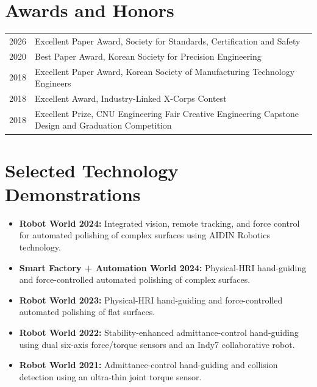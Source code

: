 \documentclass[10pt,letterpaper]{article}
\begin{document}
\section{Awards and Honors}
\begin{tabularx}{\textwidth}{@{}r X@{}}
2026 & Excellent Paper Award, Society for Standards, Certification and Safety\\
2020 & Best Paper Award, Korean Society for Precision Engineering\\
2018 & Excellent Paper Award, Korean Society of Manufacturing Technology Engineers\\
2018 & Excellent Award, Industry-Linked X-Corps Contest\\
2018 & Excellent Prize, CNU Engineering Fair Creative Engineering Capstone Design and Graduation Competition
\end{tabularx}

\section{Selected Technology Demonstrations}
\begin{itemize}
  \item \textbf{Robot World 2024:} Integrated vision, remote tracking, and force control for automated polishing of complex surfaces using AIDIN Robotics technology.
  \item \textbf{Smart Factory + Automation World 2024:} Physical-HRI hand-guiding and force-controlled automated polishing of complex surfaces.
  \item \textbf{Robot World 2023:} Physical-HRI hand-guiding and force-controlled automated polishing of flat surfaces.
  \item \textbf{Robot World 2022:} Stability-enhanced admittance-control hand-guiding using dual six-axis force/torque sensors and an Indy7 collaborative robot.
  \item \textbf{Robot World 2021:} Admittance-control hand-guiding and collision detection using an ultra-thin joint torque sensor.
\end{itemize}
\end{document}
